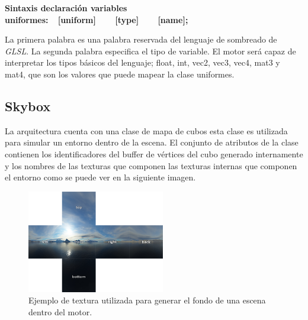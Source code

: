 \documentclass[a4paper]{book}
\begin{document}
\centerline{\textbf{Sintaxis declaración variables uniformes:\ \ [uniform]\ \ \ \ [type]\ \ \ \ [name];}}

La primera palabra es una palabra reservada del lenguaje de sombreado de \textit{GLSL}. La segunda palabra especifica el tipo de variable. El motor
será capaz de interpretar los tipos básicos del lenguaje; float, int, vec2, vec3, vec4, mat3 y mat4, que son los valores que puede mapear
la clase uniformes.

\subsection{Skybox}
\label{subsec:Skybox}

La arquitectura cuenta con una clase de mapa de cubos esta clase es utilizada para simular un entorno dentro de la escena. El conjunto de
atributos de la clase contienen los identificadores del buffer de vértices del cubo generado internamente y los nombres de las texturas
que componen las texturas internas que componen el entorno como se puede ver en la siguiente imagen.

\begin{figure}[H]
    \centering
    \includegraphics[width=6cm, keepaspectratio]{img/cubemaps_skybox.png}
    \caption{Ejemplo de textura utilizada para generar el fondo de una escena dentro del motor.}
    \label{cubemaps_skybox}
\end{figure}
\end{document}
